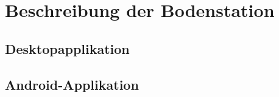 \section{Beschreibung der Bodenstation}
\subsection{Desktopapplikation}















\subsection{Android-Applikation}
